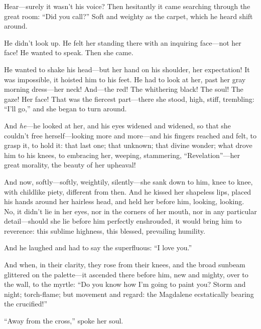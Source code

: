 \documentclass[12pt,a4paper]{article}
\begin{document}
Hear—surely it wasn’t his voice? Then hesitantly it came searching through the great room: “Did you call?” Soft and weighty as the carpet, which he heard shift around.

He didn’t look up. He felt her standing there with an inquiring face—not her face! He wanted to speak. Then she came.

He wanted to shake his head—but her hand on his shoulder, her expectation! It was impossible, it hoisted him to his feet. He had to look at her, past her gray morning dress—her neck! And—the red! The whithering black! The soul! The gaze! Her face! That was the fiercest part—there she stood, high, stiff, trembling: “I’ll go,” and she began to turn around.

And \textit{he}—he looked at her, and his eyes widened and widened, so that she couldn’t free herself—looking more and more—and his fingers reached and felt, to grasp it, to hold it: that last one; that unknown; that divine wonder; what drove him to his knees, to embracing her, weeping, stammering, “Revelation”—her great morality, the beauty of her upheaval!

And now, softly—softly, weightily, silently—she sank down to him, knee to knee, with childlike piety, different from then. And he kissed her shapeless lips, placed his hands around her hairless head, and held her before him, looking, looking. No, it didn’t lie in her eyes, nor in the corners of her mouth, nor in any particular detail—should she lie before him perfectly enshrouded, it would bring him to reverence: this sublime highness, this blessed, prevailing humility.

And he laughed and had to say the superfluous: “I love you.”

And when, in their clarity, they rose from their knees, and the broad sunbeam glittered on the palette—it ascended there before him, new and mighty, over to the wall, to the myrtle: “Do you know how I’m going to paint you? Storm and night; torch-flame; but movement and regard: the Magdalene ecstatically bearing the crucified!”

“Away from the cross,” spoke her soul.
\end{document}
